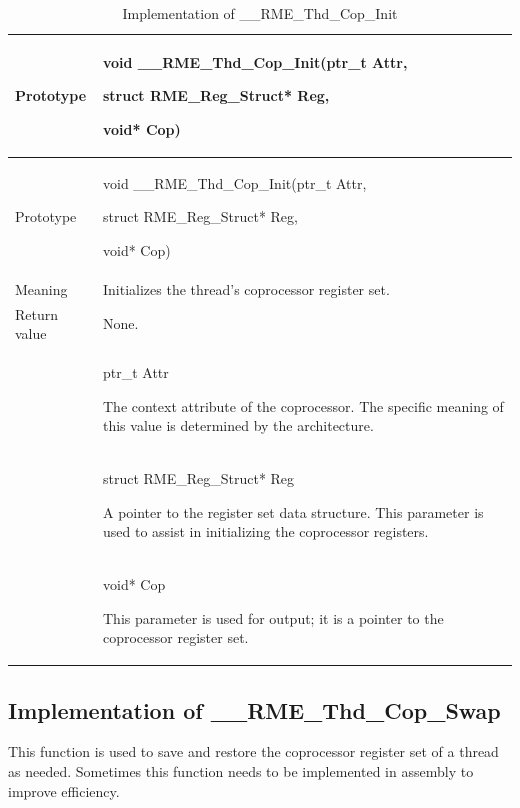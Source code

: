 \begin{xltabular}{\textwidth}{@{}>{\hsize\raggedright\arraybackslash}X>{\hsize\raggedright\arraybackslash}X@{}}
\caption{Implementation of \_\_RME\_Thd\_Cop\_Init}\label{tab:7-71-rme-thd-cop-init-implementation}\\
\toprule
Prototype\strut
 & void \_\_RME\_Thd\_Cop\_Init(ptr\_t Attr,

struct RME\_Reg\_Struct* Reg,

void* Cop)\strut
\tabularnewline
\endfirsthead
\toprule
Prototype\strut
 & void \_\_RME\_Thd\_Cop\_Init(ptr\_t Attr,

struct RME\_Reg\_Struct* Reg,

void* Cop)\strut
\tabularnewline
\midrule
\endhead
\bottomrule
\endlastfoot
Meaning & Initializes the thread's coprocessor register set.\tabularnewline
Return value & None.\tabularnewline
{} & ptr\_t Attr

The context attribute of the coprocessor. The specific meaning of this value is determined by the architecture.\strut
\tabularnewline
\strut
 & struct RME\_Reg\_Struct* Reg

A pointer to the register set data structure. This parameter is used to assist in initializing the coprocessor registers.\strut
\tabularnewline
\strut
 & void* Cop

This parameter is used for output; it is a pointer to the coprocessor register set.\strut
\tabularnewline
\end{xltabular}
\nopagebreak[4]

\subsection{Implementation of \_\_RME\_Thd\_Cop\_Swap}\label{subsec:7-rme-thd-cop-swap-implementation}

This function is used to save and restore the coprocessor register set of a thread as needed. Sometimes this function needs to be implemented in assembly to improve efficiency.

